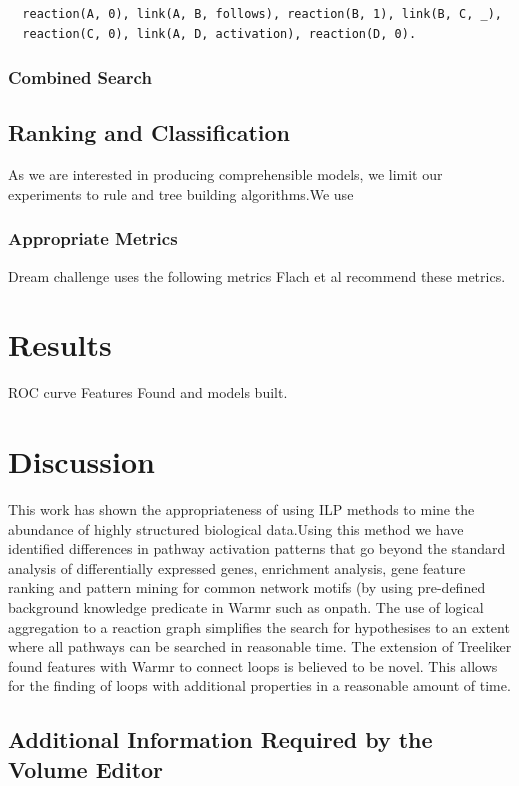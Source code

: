 \documentclass[runningheads,a4paper]{llncs}
\begin{document}
\noindent
\begin{verbatim}
  reaction(A, 0), link(A, B, follows), reaction(B, 1), link(B, C, _),    
  reaction(C, 0), link(A, D, activation), reaction(D, 0).
\end{verbatim}



\subsubsection{Combined Search}
	     
\subsection{Ranking and Classification}
As we are interested in producing comprehensible models, we limit our experiments to rule and tree building algorithms.We use 
\subsubsection{Appropriate Metrics}
Dream challenge uses the following metrics
Flach et al recommend these metrics. 
	     
\section{Results}
ROC curve
Features Found and models built.
\section{Discussion}
This work has shown the appropriateness of using ILP methods to mine the abundance of highly structured biological data.Using this method we have identified differences in pathway activation patterns that go beyond the standard analysis of differentially expressed genes, enrichment analysis, gene feature ranking and pattern mining for common network motifs (by using pre-defined background knowledge predicate in Warmr such as onpath. The use of logical aggregation to a  reaction graph simplifies the search for hypothesises to an extent where all pathways can be searched in reasonable time. The extension of Treeliker found features with Warmr to connect loops is believed to be novel. This allows for the finding of loops with additional properties in a reasonable amount of time.  



\subsection{Additional Information Required by the Volume Editor}
\end{document}
